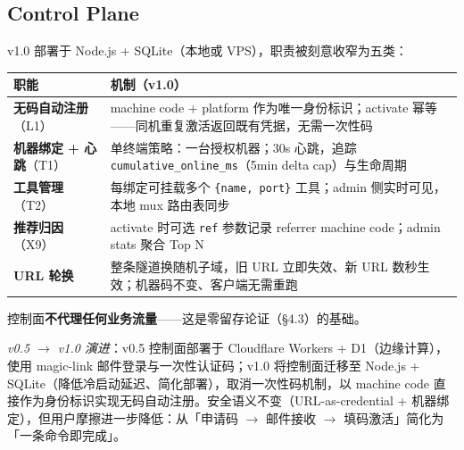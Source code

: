 \documentclass[10pt,a4paper]{article}
\begin{document}
\subsection{Control Plane}
v1.0 部署于 Node.js + SQLite（本地或 VPS），职责被刻意收窄为五类：

\begin{longtable}{@{}p{3.6cm}p{10.2cm}@{}}
\toprule
职能 & 机制（v1.0）\\
\midrule
\textbf{无码自动注册}（L1） & machine code + platform 作为唯一身份标识；activate 幂等——同机重复激活返回既有凭据，无需一次性码\\
\addlinespace[2pt]
\textbf{机器绑定 + 心跳}（T1） & 单终端策略：一台授权机器；30s 心跳，追踪 \texttt{cumulative\_online\_ms}（5min delta cap）与生命周期\\
\addlinespace[2pt]
\textbf{工具管理}（T2） & 每绑定可挂载多个 \texttt{\{name, port\}} 工具；admin 侧实时可见，本地 mux 路由表同步\\
\addlinespace[2pt]
\textbf{推荐归因}（X9） & activate 时可选 \texttt{ref} 参数记录 referrer machine code；admin stats 聚合 Top N\\
\addlinespace[2pt]
\textbf{URL 轮换} & 整条隧道换随机子域，旧 URL 立即失效、新 URL 数秒生效；机器码不变、客户端无需重跑\\
\bottomrule
\end{longtable}

\noindent 控制面\textbf{不代理任何业务流量}——这是零留存论证（§4.3）的基础。

\noindent\textit{v0.5 $\rightarrow$ v1.0 演进}：v0.5 控制面部署于 Cloudflare Workers + D1（边缘计算），使用 magic-link 邮件登录与一次性认证码；v1.0 将控制面迁移至 Node.js + SQLite（降低冷启动延迟、简化部署），取消一次性码机制，以 machine code 直接作为身份标识实现无码自动注册。安全语义不变（URL-as-credential + 机器绑定），但用户摩擦进一步降低：从「申请码 $\rightarrow$ 邮件接收 $\rightarrow$ 填码激活」简化为「一条命令即完成」。
\end{document}
